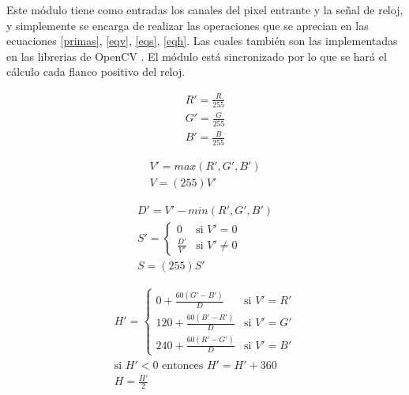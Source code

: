 \documentclass[twoside,spanish,ESP,MSc]{plantillaLabUPV}
\theoremstyle{definition}
\begin{document}
Este módulo tiene como entradas los canales del pixel entrante y la señal de reloj, y simplemente se encarga de realizar las operaciones que se aprecian en las ecuaciones \ref{primas}, \ref{eqv}, \ref{eqs}, \ref{eqh}. Las cuales también son las implementadas en las librerias de OpenCV  \cite{ocvbook}. %
El módulo está sincronizado por lo que se hará el cálculo cada flanco positivo del reloj.

\begin{equation} \label{primas}
\begin{aligned}
R' = \frac{R}{255}\\
G' = \frac{G}{255}\\
B' = \frac{B}{255}
\end{aligned}
\end{equation}

\begin{equation} \label{eqv}
\begin{gathered}
V'= max(R',G',B')\\
V = (255)V'
\end{gathered}
\end{equation}

\begin{equation} \label{eqs}
\begin{gathered}
D' = V' - min(R',G',B') \\
S' = \left \{ \begin{matrix} 
				0 & \mbox{si } V' = 0 \\
				\frac{D'}{V'} & \mbox{si }V' \neq 0
			  \end{matrix}\right. \\
S = (255)S'
\end{gathered}
\end{equation}

\begin{equation}\label{eqh}
\begin{gathered}
{ H' = \left \{ \begin{matrix} 0 + \frac{60(G'-B')}{D} & \mbox{si }V'=R'
	\\ 120 + \frac{60(B'-R')}{D} & \mbox{si } V'=G'
	\\ 240 + \frac{60(R'-G')} {D} & \mbox{si }V'=B'\end{matrix}\right. } \\
\mbox{si } H' < 0 \mbox{ entonces } H' = H' + 360 \\
H = \frac{H'}{2}
\end{gathered}
\end{equation}
\end{document}
